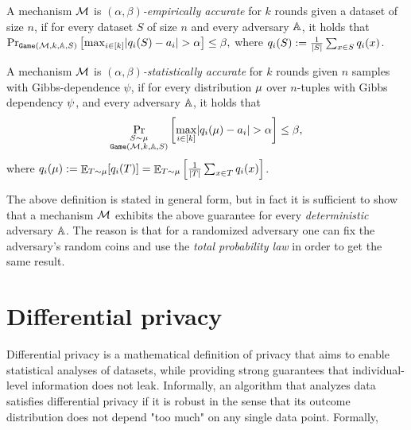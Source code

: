\documentclass[12pt,a4paper,oneside,onecolumn]{book}
\begin{document}
\begin{definition}
  A mechanism $\mathcal{M}$ is {\em $(\alpha,\beta)$-empirically accurate} for $k$ rounds given a dataset of size $n$,
  if for every dataset $S$ of size $n$ and every adversary $\mathbb{A}$, it holds that 
  $
    \Pr_{\texttt{Game}(\mathcal{M},k,\mathbb{A},S)}\left[
      \max_{i\in [k]} \lvert q_i(S) - a_i\rvert > \alpha
    \right] \leq \beta,
  $ 
  where $q_i(S) := \frac{1}{|S|}\sum_{x\in S}q_i(x)$.
\end{definition}


\begin{definition}\label{def:adaptiveaccuracy}
  A mechanism $\mathcal{M}$ is {\em $(\alpha,\beta)$-statistically accurate} for $k$ rounds given $n$ samples with Gibbs-dependence $\psi$, 
  if for every distribution $\mu$ over $n$-tuples with Gibbs dependency $\psi$, and every adversary $\mathbb{A}$, 
  it holds that 
  \[
    \Pr_{\substack{S\sim\mu\\\texttt{Game}(\mathcal{M},k,\mathbb{A},S)}}\left[
      \max_{i\in [k]} \lvert q_i(\mu) - a_i\rvert > \alpha
    \right] \leq \beta,
  \]
  where 
  $q_i(\mu) := \mathop{\mathbb{E}}_{T\sim\mu}[q_i(T)]=\mathop{\mathbb{E}}_{T\sim\mu}\left[\frac{1}{|T|}\sum_{x\in T}q_i(x)\right]$.
\end{definition}

\begin{remark}
\label{rem:det-is-suff}
    The above definition is stated in general form, but in fact it is sufficient to show that a mechanism $\mathcal{M}$ exhibits the above guarantee for every \emph{deterministic} adversary $\mathbb{A}$. The reason is that for a randomized adversary one can fix the adversary's random coins and use the \emph{total probability law} in order to get the same result. 
\end{remark}

\section{Differential privacy}

Differential privacy \citep{dwork2006calibrating} is a mathematical definition of privacy that aims to enable statistical analyses of datasets, while providing strong guarantees that individual-level information does not leak. Informally, an algorithm that analyzes data satisfies differential privacy if it is robust in the sense that its outcome distribution does not depend "too much" on any single data point. Formally,
\end{document}
